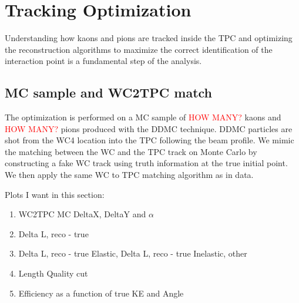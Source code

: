 \chapter{Tracking Optimization}
Understanding how kaons and pions are tracked inside the TPC and optimizing the reconstruction algorithms to maximize the correct identification of the interaction point is a fundamental step of the analysis. 


\section{MC sample and WC2TPC match}
The optimization is performed on a MC sample of \textcolor{red}{HOW MANY?} kaons and \textcolor{red}{HOW MANY?} pions produced with the DDMC technique. 
DDMC particles are shot from the WC4 location into the TPC following the beam profile.
We mimic the matching between the WC and the TPC track on Monte Carlo by constructing a fake WC track using truth information at the true initial point. We then apply the same WC to TPC matching algorithm as in data. 

Plots I want in this section:
\begin{enumerate}
\item WC2TPC MC DeltaX, DeltaY and $\alpha$
\item Delta L, reco - true
\item Delta L, reco - true Elastic, Delta L, reco - true Inelastic, other
\item Length Quality cut
\item Efficiency as a function of true KE and Angle
\end{enumerate}